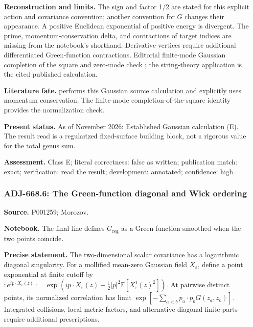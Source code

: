 \noindent\textbf{Reconstruction and limits.} The sign and factor 1/2 are stated for this explicit action and covariance convention; another convention for \(G\) changes their appearance. A positive Euclidean exponential of positive energy is divergent. The prime, momentum-conservation delta, and contractions of target indices are missing from the notebook's shorthand. Derivative vertices require additional differentiated Green-function contractions. Editorial finite-mode Gaussian completion of the square and zero-mode check \oursComputed; the string-theory application is the cited published calculation.\par

\noindent\textbf{Literature fate.} \citet[\S6, (6.21)--(6.24)]{belavinknizhnik1986complex} performs this Gaussian source calculation and explicitly uses momentum conservation. The finite-mode completion-of-the-square identity provides the normalization check.\par

\noindent\textbf{Present status.} As of November 2026: Established Gaussian calculation (E). The result read is a regularized fixed-surface building block, not a rigorous value for the total genus sum.\par

\noindent\textbf{Assessment.} Class E; literal correctness: false as written; publication match: exact; verification: read the result; development: annotated; confidence: high.\par

\subsubsection{ADJ-668.6: The Green-function diagonal and Wick ordering}
\noindent\textbf{Source.} P001259; Morozov.\par
\noindent\textbf{Notebook.} The final line defines \(G_{\mathrm{reg}}\) as a Green function smoothed when the two points coincide.\par

\noindent\textbf{Precise statement.} The two-dimensional scalar covariance has a logarithmic diagonal singularity. For a mollified mean-zero Gaussian field \(X_\varepsilon\), define a point exponential at finite cutoff by \(:e^{ip\cdot X_\varepsilon(z)}:=\exp(ip\cdot X_\varepsilon(z)+\frac12|p|^2\mathbb E[X_\varepsilon^1(z)^2])\). At pairwise distinct points, its normalized correlation has limit \(\exp[-\sum_{a<b}p_a\cdot p_bG(z_a,z_b)]\). Integrated collisions, local metric factors, and alternative diagonal finite parts require additional prescriptions.\par

